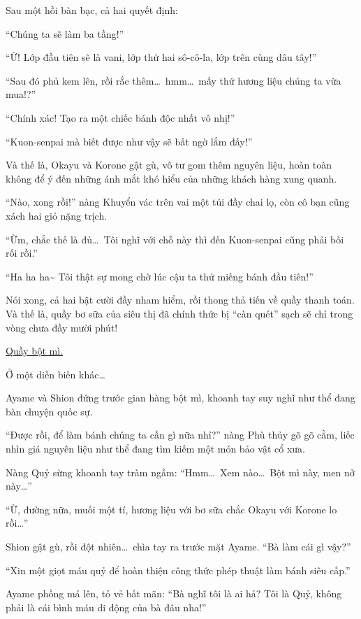 \documentclass[../main.tex]{subfiles}
\begin{document}
Sau một hồi bàn bạc, cả hai quyết định:

``Chúng ta sẽ làm ba tầng!''

``Ừ! Lớp đầu tiên sẽ là vani, lớp thứ hai sô-cô-la, lớp trên cùng dâu tây!''

``Sau đó phủ kem lên, rồi rắc thêm\dots\ hmm\dots\ mấy thứ hương liệu chúng ta vừa mua!?''

``Chính xác! Tạo ra một chiếc bánh độc nhất vô nhị!''

``Kuon-senpai mà biết được như vậy sẽ bất ngờ lắm đấy!''

Và thế là, Okayu và Korone gật gù, vô tư gom thêm nguyên liệu, hoàn toàn không để ý đến những ánh mắt khó hiểu của những khách hàng xung quanh.

\ct

``Nào, xong rồi!'' nàng Khuyển vác trên vai một túi đầy chai lọ, còn cô bạn cũng xách hai giỏ nặng trịch.

``Ừm, chắc thế là đủ\dots\ Tôi nghĩ với chỗ này thì đến Kuon-senpai cũng phải bối rối rồi.''

``Ha ha ha\~{} Tôi thật sự mong chờ lúc cậu ta thử miếng bánh đầu tiên!''

Nói xong, cả hai bật cười đầy nham hiểm, rồi thong thả tiến về quầy thanh toán. Và thế là, quầy bơ sữa của siêu thị đã chính thức bị ``càn quét'' sạch sẽ chỉ trong vòng chưa đầy mười phút!

\begin{center}
    \uline{Quầy bột mì.}
\end{center}

Ở một diễn biến khác\dots

Ayame và Shion đứng trước gian hàng bột mì, khoanh tay suy nghĩ như thể đang bàn chuyện quốc sự.

``Được rồi, để làm bánh chúng ta cần gì nữa nhỉ?'' nàng Phù thủy gõ gõ cằm, liếc nhìn giá nguyên liệu như thể đang tìm kiếm một món bảo vật cổ xưa.

Nàng Quỷ sừng khoanh tay tràm ngầm: ``Hmm\dots\ Xem nào\dots\ Bột mì này, men nở này\dots''

``Ừ, đường nữa, muối một tí, hương liệu với bơ sữa chắc Okayu với Korone lo rồi\dots''

Shion gật gù, rồi đột nhiên\dots\ chìa tay ra trước mặt Ayame. ``Bà làm cái gì vậy?''

``Xin một giọt máu quỷ để hoàn thiện công thức phép thuật làm bánh siêu cấp.''

Ayame phồng má lên, tỏ vẻ bất mãn: ``Bà nghĩ tôi là ai hả? Tôi là Quỷ, không phải là cái bình máu di động của bà đâu nha!''
\end{document}
